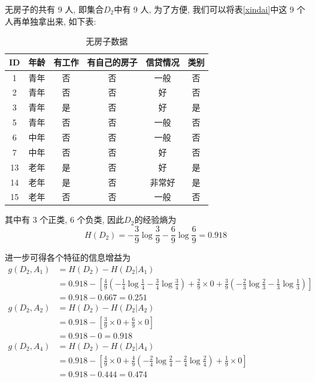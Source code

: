 \documentclass[a4paper,UTF8]{ctexart}
\theoremstyle{plain} \newtheorem{theorem}{定理}[section]
\theoremstyle{plain} \newtheorem{definition}{定义}[section]
\theoremstyle{plain} \newtheorem{lemma}{引理}[section]
\theoremstyle{plain} \newtheorem{proposition}{命题}[section]
\theoremstyle{plain} \newtheorem{example}{例}
\theoremstyle{plain} \newtheorem{remark}{注}
\theoremstyle{plain} \newtheorem{corollary}{推论}[section]
\begin{document}
无房子的共有 9 人, 即集合$D_{2}$中有 9 人, 为了方便, 我们可以将表\ref{xindai}中这 9 个人再单独拿出来, 如下表:
\begin{table}[!htb]
\centering
\caption{无房子数据}
\label{house}
\begin{tabular}{cccccc}
  \hline
    \textbf{ID} & \textbf{年龄} & \textbf{有工作} & \textbf{有自己的房子} & \textbf{信贷情况} & \textbf{类别}\\
    \hline
    1 & 青年 & 否 & 否 &  一般  & 否 \\
    \hline
    2 & 青年 & 否 & 否 &  好  & 否 \\
    \hline
    3 & 青年 & 是 & 否 &  好  & 是 \\
    \hline
    5 & 青年 & 否 & 否 &  一般  & 否 \\
    \hline
    6 & 中年 & 否 & 否 &  一般  & 否 \\
    \hline
    7 & 中年 & 否 & 否 &  好  & 否 \\
    \hline
    13 & 老年 & 是 & 否 &  好  & 是 \\
    \hline
    14 & 老年 & 是 & 否 &  非常好  & 是 \\
    \hline
    15 & 老年 & 否 & 否 &  一般  & 否 \\

  \hline
\end{tabular}
\end{table}

其中有 3 个正类, 6 个负类, 因此$D_{2}$的经验熵为
\begin{equation*}
H(D_{2}) = - \frac{3}{9} \log \frac{3}{9} - \frac{6}{9} \log \frac{6}{9} = 0.918
\end{equation*}

进一步可得各个特征的信息增益为
\begin{align*}
g(D_{2},A_{1}) & = H(D_{2}) - H(D_{2} | A_{1}) \\ 
& = 0.918 - \left[ \frac{4}{9} \left( - \frac{1}{4} \log \frac{1}{4} - \frac{3}{4} \log \frac{3}{4} \right) + \frac{2}{9} \times 0 + \frac{3}{9} \left( - \frac{2}{3} \log \frac{2}{3} - \frac{1}{3} \log \frac{1}{3} \right) \right] \\ 
& = 0.918 - 0.667 = 0.251 \\ 
g(D_{2},A_{2}) & = H(D_{2}) - H(D_{2} | A_{2}) \\ 
& = 0.918 - \left[ \frac{3}{9} \times 0 + \frac{6}{9} \times 0 \right] \\ 
& = 0.918 - 0 = 0.918 \\ 
g(D_{2},A_{4}) & = H(D_{2}) - H(D_{2} | A_{4}) \\ 
& = 0.918 - \left[ \frac{4}{9} \times 0 + \frac{4}{9} \left( - \frac{2}{4} \log \frac{2}{4} - \frac{2}{4} \log \frac{2}{4} \right) + \frac{1}{9} \times 0 \right] \\ 
& = 0.918 - 0.444 = 0.474 
\end{align*}
\end{document}
